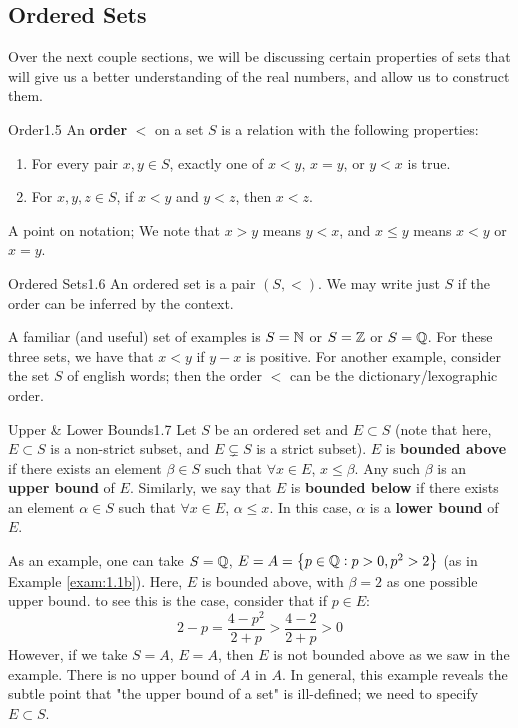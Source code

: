 \subsection{Ordered Sets}
Over the next couple sections, we will be discussing certain properties of sets that will give us a better understanding of the real numbers, and allow us to construct them.

\setcounter{rudin}{4}

\begin{definition}{Order}{1.5}
    An \textbf{order} $<$ on a set $S$ is a relation with the following properties:
    \begin{enumerate}
        \item For every pair $x, y \in S$, exactly one of $x < y$, $x = y$, or $y < x$ is true. 
        \item For $x, y, z \in S$, if $x < y$ and $y < z$, then $x < z$. 
    \end{enumerate}
    A point on notation; We note that $x > y$ means $y < x$, and $x \leq y$ means $x < y$ or $x = y$. 
\end{definition}

\begin{definition}{Ordered Sets}{1.6}
    An ordered set is a pair $(S, <)$. We may write just $S$ if the order can be inferred by the context.
\end{definition}
A familiar (and useful) set of examples is $S = \mathbb{N}$ or $S = \mathbb{Z}$ or $S = \mathbb{Q}$. For these three sets, we have that $x < y$ if $y-x$ is positive. For another example, consider the set $S$ of english words; then the order $<$ can be the dictionary/lexographic order. 

\begin{definition}{Upper \& Lower Bounds}{1.7}
    Let $S$ be an ordered set and $E \subset S$ (note that here, $E \subset S$ is a non-strict subset, and $E \subsetneq S$ is a strict subset). $E$ is \textbf{bounded above} if there exists an element $\beta \in S$ such that $\forall x \in E$, $x \leq \beta$. Any such $\beta$ is an \textbf{upper bound} of $E$. Similarly, we say that $E$ is \textbf{bounded below} if there exists an element $\alpha \in S$ such that $\forall x \in E$, $\alpha \leq x$. In this case, $\alpha$ is a \textbf{lower bound} of $E$.
\end{definition}
As an example, one can take $S = \mathbb{Q}$, $E = A = \set{p \in \mathbb{Q}: p > 0, p^2 > 2}$ (as in Example \ref{exam:1.1b}). Here, $E$ is bounded above, with $\beta = 2$ as one possible upper bound. to see this is the case, consider that if $p \in E$:
\[2 - p = \frac{4 - p^2}{2+p} > \frac{4-2}{2+p} > 0\]
However, if we take $S = A$, $E = A$, then $E$ is not bounded above as we saw in the example. There is no upper bound of $A$ in $A$. In general, this example reveals the subtle point that "the upper bound of a set" is ill-defined; we need to specify $E \subset S$. 

